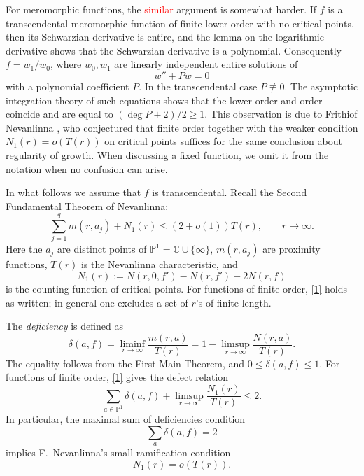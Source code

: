 \documentclass[12pt,letterpaper,reqno]{amsart}
\theoremstyle{definition}
\numberwithin{equation}{section}
\newcommand{\C}{\mathbb C}
\newcommand{\PP}{\mathbb P}
\newcommand{\revision}[1]{\textcolor{red}{#1}}
\begin{document}
For meromorphic functions, the
\revision{similar} argument is somewhat harder. If $f$ is a transcendental
meromorphic function of finite lower order with no critical points, then
its Schwarzian derivative is entire, and the lemma on the
logarithmic derivative
shows that the Schwarzian derivative is a polynomial. Consequently $f=w_1/w_0$, where
$w_0,w_1$ are linearly independent entire solutions of
\[
 w''+Pw=0
\]
with a polynomial coefficient $P$. In the transcendental case $P\not\equiv0$.
The asymptotic integration theory of such equations \cite{Was65} shows
that the lower order and order coincide and are equal to
$(\deg P+2)/2\geq1$.
This observation is due to Frithiof Nevanlinna \cite{Nev30}, who conjectured
that finite order together with the weaker condition
$N_1(r)=o(T(r))$ on critical points suffices for the same conclusion about
regularity of growth. When discussing a fixed function, we omit it from
the notation when no confusion can arise.

In what follows we assume that $f$ is transcendental.
Recall the Second Fundamental Theorem of Nevanlinna:
\begin{equation}\label{1}
 \sum_{j=1}^q m(r,a_j)+N_1(r)\leq(2+o(1))T(r),\qquad r\to\infty.
\end{equation}
Here the $a_j$ are distinct points of $\PP^1=\C\cup\{\infty\}$,
$m(r,a_j)$ are proximity functions, $T(r)$ is the Nevanlinna
characteristic, and
\[
 N_1(r):=N(r,0,f')-N(r,f')+2N(r,f)
\]
is the counting function of critical points. For functions of finite order,
\eqref{1} holds as written; in general one excludes a set of $r$'s of
finite length.

The \emph{deficiency} is defined as
\[
 \delta(a,f)=\liminf_{r\to\infty}\frac{m(r,a)}{T(r)}
 =1-\limsup_{r\to\infty}\frac{N(r,a)}{T(r)}.
\]
The equality follows from the First Main Theorem, and
$0\leq\delta(a,f)\leq1$. For functions of finite order, \eqref{1} gives
the defect relation
\begin{equation}\label{2}
 \sum_{a\in\PP^1}\delta(a,f)
 +\limsup_{r\to\infty}\frac{N_1(r)}{T(r)}\leq2.
\end{equation}
In particular, the maximal sum of deficiencies condition
\begin{equation}\label{sum}
 \sum_a\delta(a,f)=2
\end{equation}
implies F.~Nevanlinna's small-ramification condition
\begin{equation}\label{smal}
 N_1(r)=o(T(r)).
\end{equation}
\end{document}
